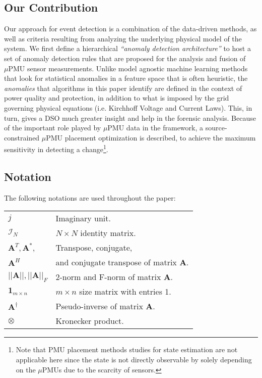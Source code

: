 \documentclass[twocolumn]{IEEEtran}
\newcommand{\mup}{\mu \text{PMU}}
\newcommand{\mb}{\mathbf}
\begin{document}
\subsection{Our Contribution}
Our approach for event detection is a combination of the data-driven methods, as well as criteria  resulting from analyzing the underlying physical model of the system.
We first define a hierarchical \textit{``anomaly detection architecture''} to host a set of anomaly detection rules that are proposed for the analysis and fusion of $\mup$ sensor measurements. Unlike model agnostic machine learning methods that look for statistical anomalies in a feature space that is often heuristic,
the \textit{anomalies} that algorithms in this paper identify are defined in the context of power quality and protection, in addition to what is imposed by the grid governing physical equations (i.e. Kirchhoff Voltage and Current Laws). This, in turn, gives a DSO much greater insight and help in the forensic analysis. Because of the important role played by $\mup$ data in the framework, a source-constrained $\mup$ placement optimization is described, to achieve the maximum sensitivity in detecting a change\footnote{Note that PMU placement methods studies for state estimation
are not applicable here since the state is not directly observable by solely depending on the $\mup$s due to the scarcity of sensors.}. 

\subsection{Notation}
The following notations are used throughout the paper:
\begin{tabular}{ll}
$j$&Imaginary unit.\\
$\mathcal{I}_N$& $N \times N$ identity matrix.\\
$\mb{A}^T, \mb{A}^*,$&Transpose, conjugate,\\
$\mb{A}^H$&and conjugate transpose of matrix $\mb{A}$.\\
$||\mb{A}||,||\mb{A}||_F$&2-norm and F-norm of matrix $\mb{A}$.\\ 
$\mb{1}_{m \times n}$&$m \times n$ size matrix with entries 1.\\
$\mb{A}^\dagger$&Pseudo-inverse of matrix $\mb{A}$.\\
$\otimes$&Kronecker product.  
\end{tabular} 
\end{document}
